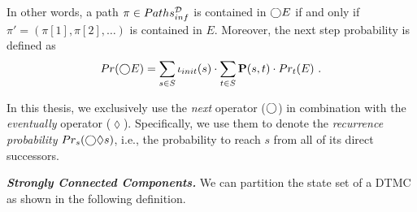 In other words, a path $\pi \in Paths^{\mathcal{D}}_{inf}$ is contained in $\bigcirc E$ if and only if $\pi' = (\pi[1],\pi[2],\dots)$ is contained in $E$. Moreover, the next step probability is defined as 
\[Pr(\bigcirc E) = \sum_{s\in S}\iota_{init}(s) \cdot \sum_{t \in S}\mathbf{P}(s,t)\cdot Pr_{t}(E)\ .\]

In this thesis, we exclusively use the \textit{next} operator ($\bigcirc$) in combination with the \textit{eventually} operator ($\lozenge$). Specifically, we use them to denote the \textit{recurrence probability} $Pr_s(\bigcirc\lozenge s)$, i.e., the probability to reach $s$ from all of its direct successors.




    
\emph{\textbf{Strongly Connected Components.}} We can partition the state set of a DTMC as shown in the following definition.

